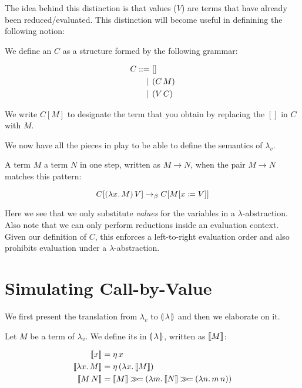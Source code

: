 The idea behind this distinction is that values ($V$) are terms that have
already been reduced/evaluated. This distinction will become useful in
definining the following notion:

\begin{definition}
  We define an  $C$ as a structure formed by the
  following grammar:

\begin{align*}
  C ::= &\ [] \\
  | \, &\ (C\,M) \\
  | \, &\ (V\,C)
\end{align*}

  We write $C[M]$ to designate the term that you obtain by replacing the
  $[]$ in $C$ with $M$.
\end{definition}

We now have all the pieces in play to be able to define the semantics of
$\lambda_v$.

\begin{definition}
  A term $M$  a term $N$ in one step, written as $M \to
  N$, when the pair $M \to N$ matches this pattern:

$$
C[(\lambda x.\, M)\,V] \to_\beta C[M[x \coloneqq V]]
$$
\end{definition}

Here we see that we only substitute \emph{values} for the variables in a
$\lambda$-abstraction. Also note that we can only perform reductions inside
an evaluation context. Given our definition of $C$, this enforces a
left-to-right evaluation order and also prohibits evaluation under a
$\lambda$-abstraction.


\section{Simulating Call-by-Value}
\label{ssec:simulating-cbv}

We first present the translation from $\lambda_v$ to $\llparenthesis \, \lambda \, \rrparenthesis$ and
then we elaborate on it.

\begin{definition}
  Let $M$ be a term of $\lambda_v$. We define its  in
  $\llparenthesis \, \lambda \, \rrparenthesis$, written as $\llbracket M \rrbracket$:

\begin{align*}
  \llbracket x \rrbracket &= \eta\,x \\
  \llbracket \lambda x.\, M \rrbracket &= \eta\,(\lambda x.\, \llbracket M \rrbracket) \\
  \llbracket M\,N \rrbracket &= \llbracket M \rrbracket \mathbin{\gg\!=} (\lambda m.\, \llbracket N \rrbracket \mathbin{\gg\!=} (\lambda n.\, m\,n))
\end{align*}
\end{definition}

